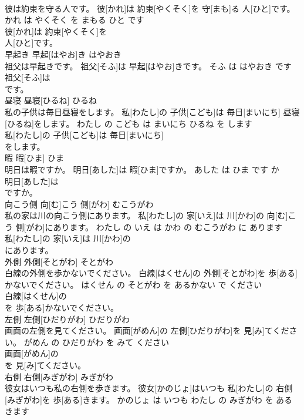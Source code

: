\documentclass[8pt]{extreport}
\begin{document}
\begin{CJK}{UTF8}{min}
\\	彼は約束を守る人です。	彼[かれ]は 約束[やくそく]を 守[まも]る 人[ひと]です。	かれ は やくそく を まもる ひと です	
\\	彼[かれ]は 約束[やくそく]を
\\	人[ひと]です。			
\\	早起き	早起[はやお]き	はやおき	
\\	祖父は早起きです。	祖父[そふ]は 早起[はやお]きです。	そふ は はやおき です	
\\	祖父[そふ]は
\\	です。			
\\	昼寝	昼寝[ひるね]	ひるね	
\\	私の子供は毎日昼寝をします。	私[わたし]の 子供[こども]は 毎日[まいにち] 昼寝[ひるね]をします。	わたし の こども は まいにち ひるね を します	
\\	私[わたし]の 子供[こども]は 毎日[まいにち]
\\	をします。			
\\	暇	暇[ひま]	ひま	
\\	明日は暇ですか。	明日[あした]は 暇[ひま]ですか。	あした は ひま です か	
\\	明日[あした]は
\\	ですか。			
\\	向こう側	向[む]こう 側[がわ]	むこうがわ	
\\	私の家は川の向こう側にあります。	私[わたし]の 家[いえ]は 川[かわ]の 向[む]こう 側[がわ]にあります。	わたし の いえ は かわ の むこうがわ に あります	
\\	私[わたし]の 家[いえ]は 川[かわ]の
\\	にあります。			
\\	外側	外側[そとがわ]	そとがわ	
\\	白線の外側を歩かないでください。	白線[はくせん]の 外側[そとがわ]を 歩[ある]かないでください。	はくせん の そとがわ を あるかない で ください	
\\	白線[はくせん]の
\\	を 歩[ある]かないでください。			
\\	左側	左側[ひだりがわ]	ひだりがわ	
\\	画面の左側を見てください。	画面[がめん]の 左側[ひだりがわ]を 見[み]てください。	がめん の ひだりがわ を みて ください	
\\	画面[がめん]の
\\	を 見[み]てください。			
\\	右側	右側[みぎがわ]	みぎがわ	
\\	彼女はいつも私の右側を歩きます。	彼女[かのじょ]はいつも 私[わたし]の 右側[みぎがわ]を 歩[ある]きます。	かのじょ は いつも わたし の みぎがわ を あるきます	

\end{CJK}
\end{document}
